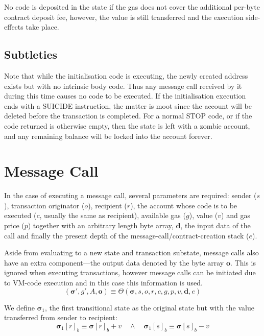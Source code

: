 \documentclass[9pt,oneside]{amsart}
\begin{document}
\begin{multicols}{2}
No code is deposited in the state if the gas does not cover the additional per-byte contract deposit fee, however, the value is still transferred and the execution side-effects take place.

\subsection{Subtleties}
Note that while the initialisation code is executing, the newly created address exists but with no intrinsic body code. Thus any message call received by it during this time causes no code to be executed. If the initialisation execution ends with a {\small SUICIDE} instruction, the matter is moot since the account will be deleted before the transaction is completed. For a normal {\small STOP} code, or if the code returned is otherwise empty, then the state is left with a zombie account, and any remaining balance will be locked into the account forever.

\section{Message Call} \label{ch:call}
In the case of executing a message call, several parameters are required: sender ($s$), transaction originator ($o$), recipient ($r$), the account whose code is to be executed ($c$, usually the same as recipient), available gas ($g$), value ($v$) and gas price ($p$) together with an arbitrary length byte array, $\mathbf{d}$, the input data of the call and finally the present depth of the message-call/contract-creation stack ($e$).

Aside from evaluating to a new state and transaction substate, message calls also have an extra component---the output data denoted by the byte array $\mathbf{o}$. This is ignored when executing transactions, however message calls can be initiated due to VM-code execution and in this case this information is used.
\begin{equation}
(\boldsymbol{\sigma}', g', A, \mathbf{o}) \equiv \Theta(\boldsymbol{\sigma}, s, o, r, c, g, p, v, \mathbf{d}, e)
\end{equation}

We define $\boldsymbol{\sigma}_1$, the first transitional state as the original state but with the value transferred from sender to recipient:
\begin{equation}
\boldsymbol{\sigma}_1[r]_b \equiv \boldsymbol{\sigma}[r]_b + v \quad\wedge\quad \boldsymbol{\sigma}_1[s]_b \equiv \boldsymbol{\sigma}[s]_b - v
\end{equation}


\end{multicols}
\end{document}
